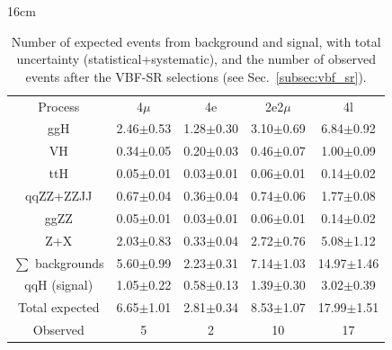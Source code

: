 \begin{table}[hbtp]{16cm}
	\caption{Number of expected events from background and signal, with total uncertainty (statistical+systematic), and the number of observed events after the VBF-SR selections (see Sec.~\ref{subsec:vbf_sr}).}
	\centering
	\begin{tabular}{c|c|c|c|c}
		\hline
		\rowcolor{light_gray}
		Process                     & 4$\mu$        & 4e            & 2e2$\mu$      & 4l\\
		ggH                         & 2.46$\pm$0.53 & 1.28$\pm$0.30 & 3.10$\pm$0.69 & 6.84$\pm$0.92\\
		VH                          & 0.34$\pm$0.05 & 0.20$\pm$0.03 & 0.46$\pm$0.07 & 1.00$\pm$0.09\\
		ttH                         & 0.05$\pm$0.01 & 0.03$\pm$0.01 & 0.06$\pm$0.01 & 0.14$\pm$0.02\\
		qqZZ+ZZJJ                   & 0.67$\pm$0.04 & 0.36$\pm$0.04 & 0.74$\pm$0.06 & 1.77$\pm$0.08\\
		ggZZ                        & 0.05$\pm$0.01 & 0.03$\pm$0.01 & 0.06$\pm$0.01 & 0.14$\pm$0.02\\
		Z+X                         & 2.03$\pm$0.83 & 0.33$\pm$0.04 & 2.72$\pm$0.76 & 5.08$\pm$1.12\\
		\hline
		$\sum$ backgrounds          & 5.60$\pm$0.99 & 2.23$\pm$0.31 & 7.14$\pm$1.03 & 14.97$\pm$1.46\\
		\hline
		qqH (signal) & 1.05$\pm$0.22 & 0.58$\pm$0.13 & 1.39$\pm$0.30 &  3.02$\pm$0.39\\
		\hline
		Total expected              & 6.65$\pm$1.01 & 2.81$\pm$0.34 & 8.53$\pm$1.07 & 17.99$\pm$1.51\\
		\hline
		Observed                    & 5             & 2             & 10            & 17\\
		\hline
	\end{tabular}
	\label{tab:vbf_sr_final_yields}
\end{table}

